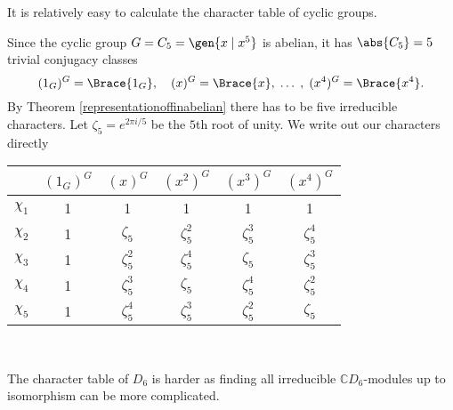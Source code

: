 \documentclass[../Project.tex]{subfiles}
\begin{document}
It is relatively easy to calculate the character table of cyclic groups.

\begin{exam}
	Since the cyclic group $G = C_5 = \gen{x \;\vert\;x^5}$ is abelian, it has $\abs{C_5} = 5$ trivial conjugacy classes
	$$(1_G)^G = \Brace{1_G},\quad (x)^{G} = \Brace{x},\;\dots\;,\;(x^4)^{G} = \Brace{x^4}.$$
	By Theorem \ref{representationoffinabelian} there has to be five irreducible characters. Let $\zeta_5 = e^{2 \pi i /5}$ be the $5$th root of unity.  We write out our characters directly

	\begin{minipage}{\linewidth}
	\centering
	\begin{tabular}{c | c  c  c c c}
		  $ $ & $(1_{G})^{G}$ & $(x)^{G}$ & $(x^2)^{G}$ & $(x^3)^{G}$ & $(x^4)^{G}$\\
	\hline
		$\chi_1$ & 1 & 1 & 1 & 1 & 1\\
		$\chi_2$ & 1 & $\zeta_5$ & $\zeta_5^2$ & $\zeta_5^3$ & $\zeta_5^4$ \\
		$\chi_3$ & 1 & $\zeta_5^2$ & $\zeta_5^4$ & $\zeta_5$ & $\zeta_5^3$ \\
		$\chi_4$ & 1 & $\zeta_5^3$ & $\zeta_5$ & $\zeta_5^4$ & $\zeta_5^2$ \\
		$\chi_5$ & 1 & $\zeta_5^4$ & $\zeta_5^3$ & $\zeta_5^2$ & $\zeta_5$ \\
	\hline
	\end{tabular}
	\end{minipage}\\
\end{exam}

The character table of $D_6$ is harder as finding all irreducible $\mathbb{C}D_6$-modules up to isomorphism can be more complicated.
\end{document}
